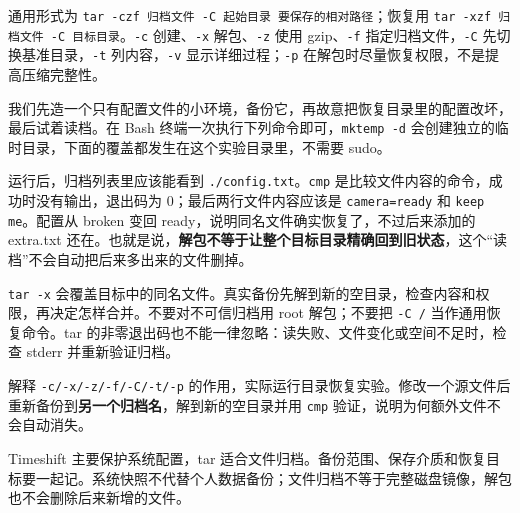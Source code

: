 通用形式为 \texttt{tar -czf 归档文件 -C 起始目录 要保存的相对路径}；恢复用 \texttt{tar -xzf 归档文件 -C 目标目录}。\texttt{-c} 创建、\texttt{-x} 解包、\texttt{-z} 使用 gzip、\texttt{-f} 指定归档文件，\texttt{-C} 先切换基准目录，\texttt{-t} 列内容，\texttt{-v} 显示详细过程；\texttt{-p} 在解包时尽量恢复权限，不是提高压缩完整性。
\begin{example}[备份、损坏、恢复与额外文件]
我们先造一个只有配置文件的小环境，备份它，再故意把恢复目录里的配置改坏，最后试着读档。在 Bash 终端一次执行下列命令即可，\texttt{mktemp -d} 会创建独立的临时目录，下面的覆盖都发生在这个实验目录里，不需要 sudo。


运行后，归档列表里应该能看到 \texttt{./config.txt}。\texttt{cmp} 是比较文件内容的命令，成功时没有输出，退出码为 0；最后两行文件内容应该是 \texttt{camera=ready} 和 \texttt{keep me}。配置从 broken 变回 ready，说明同名文件确实恢复了，不过后来添加的 extra.txt 还在。也就是说，\textbf{解包不等于让整个目标目录精确回到旧状态}，这个“读档”不会自动把后来多出来的文件删掉。
\end{example}
\begin{note}
\texttt{tar -x} 会覆盖目标中的同名文件。真实备份先解到新的空目录，检查内容和权限，再决定怎样合并。不要对不可信归档用 root 解包；不要把 \texttt{-C /} 当作通用恢复命令。tar 的非零退出码也不能一律忽略：读失败、文件变化或空间不足时，检查 stderr 并重新验证归档。
\end{note}
\begin{exercise}\label{ex:v1-tar-options}
解释 \texttt{-c/-x/-z/-f/-C/-t/-p} 的作用，实际运行目录恢复实验。修改一个源文件后重新备份到\textbf{另一个归档名}，解到新的空目录并用 \texttt{cmp} 验证，说明为何额外文件不会自动消失。
\end{exercise}
\begin{conclusion}
Timeshift 主要保护系统配置，tar 适合文件归档。备份范围、保存介质和恢复目标要一起记。系统快照不代替个人数据备份；文件归档不等于完整磁盘镜像，解包也不会删除后来新增的文件。
\end{conclusion}
